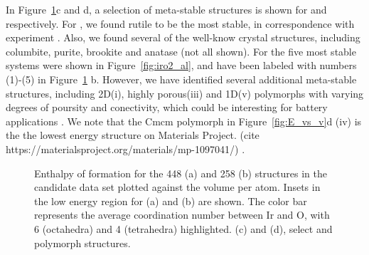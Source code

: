 %

In Figure~\ref{fig:E_vs_V}c and d, a selection of meta-stable structures is shown for \IrOtwo and \IrOthree respectively.
%
For \IrOtwo, we found rutile to be the most stable,
in correspondence with experiment \cite{}.
%
Also, we found several of the well-know \IrOtwo crystal structures, including columbite, purite, brookite and anatase (not all shown).
% 
For \IrOthree the five most stable systems were shown in Figure~\ref{fig:iro2_al},
and have been labeled with numbers (1)-(5) in Figure~\ref{fig:E_vs_V} b.
%
However, we have identified several additional meta-stable structures, including 2D(i), highly porous(iii) and 1D(v) polymorphs with varying degrees of poursity and conectivity,
which could be interesting for battery applications \cite{}.
%
We note that the \IrOthree Cmcm polymorph in Figure~\ref{fig:E_vs_v}d (iv) is the the lowest energy \IrOthree structure on Materials Project.
(cite https://materialsproject.org/materials/mp-1097041/) \cite{}.




\begin{figure}[!htb]
\centering
{}
\caption{\label{fig:E_vs_V}
%
Enthalpy of formation for the \num{448} \IrOtwo (a) and \num{258} \IrOthree (b) structures in the candidate data set plotted against the volume per atom.
%
Insets in the low energy region for (a) and (b) are shown.
%
The color bar represents the average coordination number between Ir and O, with 6 (octahedra) and 4 (tetrahedra) highlighted.
%
(c) and (d), select \IrOtwo and \IrOthree polymorph structures.
}
\end{figure}







